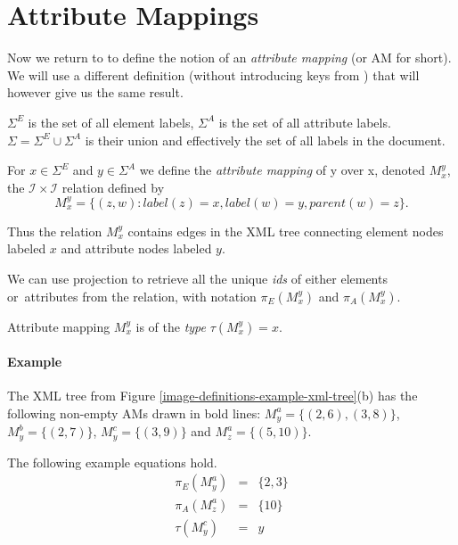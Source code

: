 \section{Attribute Mappings}
\label{section-definitions-ams}

Now we return to \cite{fidax} to define the notion of an \textit{attribute mapping} (or AM for short). 
We will use a different definition (without introducing keys from \cite{keX}) that will however give us the same result.

\begin{define}
	$\Sigma^E$ is the set of all element labels, $\Sigma^A$ is the set of all attribute labels. $\Sigma = \Sigma^E \cup \Sigma^A$ is their union and effectively the set of all labels in the document.
\end{define}

\begin{define}
	For $x \in \Sigma^E$ and $y \in \Sigma^A$ we define the \textit{attribute mapping} of y over x, denoted $M_{x}^{y}$, the $\mathcal{I} \times \mathcal{I}$ relation defined by
	\[M_{x}^{y} = \{ (z,w): label(z) = x, label(w) = y, parent(w) = z \}.\]
\end{define}

Thus the relation $M_{x}^{y}$ contains edges in the XML tree connecting element nodes labeled $x$ and attribute nodes labeled $y$.

We can use projection to retrieve all the unique \textit{ids} of either elements or~attributes from the relation, with notation $\pi_E(M_{x}^{y})$ and $\pi_A(M_{x}^{y})$.

\begin{define}
	Attribute mapping $M_{x}^{y}$ is of the \textit{type} $\tau(M_{x}^{y}) = x$.
\end{define}

\paragraph{Example}
The XML tree from Figure \ref{image-definitions-example-xml-tree}(b) has the following non-empty AMs drawn in bold lines: $M_{y}^{a} = \{(2,6), (3,8)\}$, $M_{y}^{b} = \{(2,7)\}$, $M_{y}^{c} = \{(3,9)\}$ and $M_{z}^{a} = \{(5,10)\}$.

The following example equations hold.
\begin{eqnarray*}
\pi_E(M_{y}^{a}) & = & \{2, 3\} \\
\pi_A(M_{z}^{a}) & = & \{10\} \\
\tau(M_{y}^{c}) & = & y
\end{eqnarray*}

